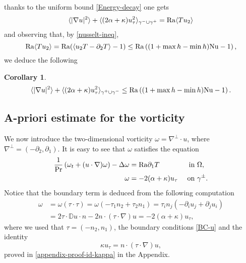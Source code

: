\documentclass{article}
\newtheorem{corollary}[theorem]{Corollary}
\theoremstyle{definition}
\theoremstyle{definition}
\newcommand{\Pra}{\rm{Pr}}
\newcommand{\Ra}{{\rm{Ra}}}
\newcommand{\Nu}{{\rm{Nu}}}
\begin{document}
thanks to the uniform bound \eqref{Energy-decay} one gets
\begin{align*}
    \langle |\nabla u|^2\rangle + \langle (2\alpha+\kappa) u_\tau^2\rangle_{\gamma^-\cup\gamma^+}= \Ra \langle T u_2 \rangle
\end{align*}
and observing that, by \eqref{nusselt-ineq}, 
\begin{equation*}
     \Ra\langle T u_2\rangle
    =  \Ra(\langle u_2T-\partial_2 T\rangle -1)
    \leq \Ra\left((1+\max h - \min h) \Nu-1\right),
\end{equation*}
we deduce the following
\begin{corollary}
\begin{align}
    \label{average-energy-balance}
    \langle|\nabla u|^2\rangle + \langle (2\alpha+\kappa) u_\tau^2\rangle_{\gamma^+\cup \gamma^-}\leq \Ra\left((1+\max h - \min h) \Nu-1\right).
\end{align}
\end{corollary}




\subsection{A-priori estimate for the vorticity}
We now introduce the two-dimensional vorticity $\omega=\nabla^{\perp}\cdot u$, where $\nabla^\perp = (-\partial_2,\partial_1)$. It is easy to see that $\omega$ satisfies the equation
\begin{equation}
    \label{vorticity-equation}
    \begin{aligned}
        \frac{1}{\Pra}\left(\omega_t +(u\cdot\nabla)\omega\right)-\Delta \omega &=\Ra \partial_1 T & \textnormal{ in }&\Omega,\\
        \omega &= -2(\alpha+\kappa)u_\tau & \textnormal{ on }&\gamma^\pm.
    \end{aligned}
\end{equation}
Notice that the boundary term is deduced from the following computation 
\begin{align*}
    \omega&=\omega (\tau\cdot\tau)= \omega (-\tau_1 n_2 +\tau_2 n_1) = \tau_i n_j (-\partial_i u_j+\partial_j u_i)\\
    &=2 \tau \cdot \mathbb{D}u \cdot n- 2n\cdot(\tau\cdot \nabla) u = -2(\alpha+\kappa)u_\tau ,
\end{align*}
where 
we used that $\tau=(-n_2,n_1)$, the boundary conditions \eqref{BC-u} and the identity 
\begin{equation}
    \label{id-kappa}
    \kappa u_{\tau}=n\cdot (\tau\cdot \nabla )u,
\end{equation}
proved in \eqref{appendix-proof-id-kappa} in the Appendix.
\end{document}
